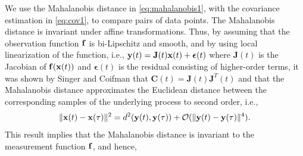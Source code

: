 We use the Mahalanobis distance in \eqref{eq:mahalanobis1}, with the covariance estimation in \eqref{eq:cov1}, to compare pairs of data points.
%
%
The Mahalanobis distance is invariant under affine transformations.
%
Thus, by assuming that the observation function $\mathbf{f}$ is bi-Lipschitz and smooth, and by using local linearization of the function, i.e., $\mathbf{y}(t) = \mathbf{J}(t) \mathbf{x}(t) + \boldsymbol{\epsilon}(t)$ where $\mathbf{J}(t)$ is the Jacobian of $\mathbf{f}(\mathbf{x}(t))$ and $\boldsymbol{\epsilon}(t)$ is the residual consisting of higher-order terms, it was shown by Singer and Coifman \cite{singer2008non} that $\mathbf{C}(t) = \mathbf{J}(t)\mathbf{J}^T(t)$ and that the Mahalanobis distance approximates the Euclidean distance between the corresponding samples of the underlying process to second order, i.e.,
\begin{equation}
	\| \mathbf{x}(t) - \mathbf{x}(\tau) \|^2 = d^2(\mathbf{y}(t), \mathbf{y}(\tau)) + \mathcal{O}(\| \mathbf{y}(t) - \mathbf{y}(\tau)\|^4).
\end{equation}
%
This result implies that the Mahalanobis distance is invariant to the measurement function $\mathbf{f}$, and hence,
